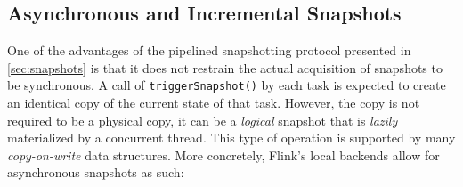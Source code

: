 

\subsection{Asynchronous and Incremental Snapshots}
\label{sec:async}
One of the advantages of the pipelined snapshotting protocol presented in \autoref{sec:snapshots} is that it does not restrain the actual acquisition of snapshots to be synchronous. A call of \texttt{triggerSnapshot()} by each task is expected to create an identical copy of the current state of that task. However, the copy is not required to be a physical copy, it can be a \emph{logical} snapshot that is \emph{lazily} materialized by a concurrent thread. This type of operation is supported by many \emph{copy-on-write} data structures. More concretely, Flink's local backends allow for asynchronous snapshots as such:

